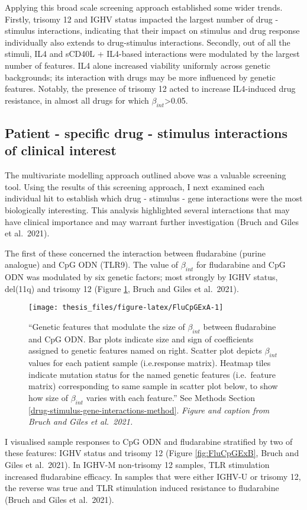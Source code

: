 \documentclass[11pt, a4paper, twosided]{book}
\begin{document}
Applying this broad scale screening approach established some wider trends. Firstly, trisomy 12 and IGHV status impacted the largest number of drug - stimulus interactions, indicating that their impact on stimulus and drug response individually also extends to drug-stimulus interactions. Secondly, out of all the stimuli, IL4 and sCD40L + IL4-based interactions were modulated by the largest number of features. IL4 alone increased viability uniformly across genetic backgrounds; its interaction with drugs may be more influenced by genetic features. Notably, the presence of trisomy 12 acted to increase IL4-induced drug resistance, in almost all drugs for which \(\beta_{int}\)\textgreater0.05.

\hypertarget{drug-stimulus-gene-predictor-profile}{%
\subsection{Patient - specific drug - stimulus interactions of clinical interest}\label{drug-stimulus-gene-predictor-profile}}

The multivariate modelling approach outlined above was a valuable screening tool. Using the results of this screening approach, I next examined each individual hit to establish which drug - stimulus - gene interactions were the most biologically interesting. This analysis highlighted several interactions that may have clinical importance and may warrant further investigation (Bruch and Giles et al.~2021).

The first of these concerned the interaction between fludarabine (purine analogue) and CpG ODN (TLR9). The value of \(\beta_{int}\) for fludarabine and CpG ODN was modulated by six genetic factors; most strongly by IGHV status, del(11q) and trisomy 12 (Figure \ref{fig:FluCpGExA}, Bruch and Giles et al.~2021).


\begin{figure}

{\centering \texttt{[image: thesis\_files/figure-latex/FluCpGExA-1]} 

}

\caption{``Genetic features that modulate the size of \(\beta_{int}\) between fludarabine and CpG ODN. Bar plots indicate size and sign of coefficients assigned to genetic features named on right. Scatter plot depicts \(\beta_{int}\) values for each patient sample (i.e.response matrix). Heatmap tiles indicate mutation status for the named genetic features (i.e.~feature matrix) corresponding to same sample in scatter plot below, to show how size of \(\beta_{int}\) varies with each feature.'' See Methods Section \ref{drug-stimulus-gene-interactions-method}. \emph{Figure and caption from Bruch and Giles et al.~2021.}}\label{fig:FluCpGExA}
\end{figure}
I visualised sample responses to CpG ODN and fludarabine stratified by two of these features: IGHV status and trisomy 12 (Figure \ref{fig:FluCpGExB}, Bruch and Giles et al.~2021). In IGHV-M non-trisomy 12 samples, TLR stimulation increased fludarabine efficacy. In samples that were either IGHV-U or trisomy 12, the reverse was true and TLR stimulation induced resistance to fludarabine (Bruch and Giles et al.~2021).
\end{document}
